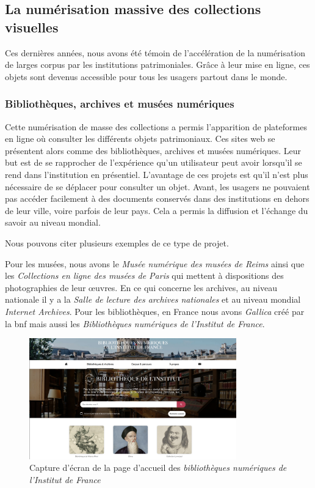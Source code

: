 \subsection{La numérisation massive des collections visuelles}

Ces dernières années, nous avons été témoin de l'accélération de la numérisation de larges corpus par les institutions patrimoniales. Grâce à leur mise en ligne, ces objets sont devenus accessible pour tous les usagers partout dans le monde. 

\subsubsection{Bibliothèques, archives et musées numériques}

Cette numérisation de masse des collections a permis l'apparition de plateformes en ligne où consulter les différents objets patrimoniaux. Ces sites web se présentent alors comme des bibliothèques, archives et musées numériques. Leur but est de se rapprocher de l'expérience qu'un utilisateur peut avoir lorsqu'il se rend dans l'institution en présentiel. L'avantage de ces projets est qu'il n'est plus nécessaire de se déplacer pour consulter un objet. Avant, les usagers ne pouvaient pas accéder facilement à des documents conservés dans des institutions en dehors de leur ville, voire parfois de leur pays. Cela a permis la diffusion et l'échange du savoir au niveau mondial.  

Nous pouvons citer plusieurs exemples de ce type de projet.

Pour les musées, nous avons le \textit{Musée numérique des musées de Reims} ainsi que les \textit{Collections en ligne des musées de Paris} qui mettent à dispositions des photographies de leur œuvres. En ce qui concerne les archives, au niveau nationale il y a la \textit{Salle de lecture des archives nationales} et au niveau mondial \textit{Internet Archives}. Pour les bibliothèques, en France nous avons \textit{Gallica} créé par la \gls{bnf} mais aussi les \textit{Bibliothèques numériques de l'Institut de France}. 

\begin{figure}[H]
	\centering
	\includegraphics[width=0.8\textwidth]{images/bib_num_institut_france.png}
	\caption{Capture d'écran de la page d'accueil des \textit{bibliothèques numériques de l'Institut de France}}
	\label{fig:institut_france}
\end{figure}

